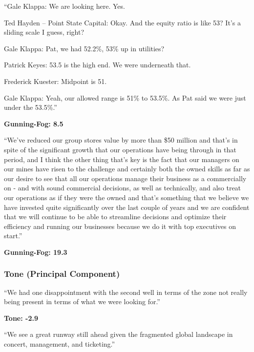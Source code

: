 \documentclass{article}[11pt]
\begin{document}
    \begin{em}
        ``Gale Klappa: We are looking here. Yes.

        Ted Hayden – Point State Capital: Okay. And the equity ratio is like 53? It’s a sliding scale I guess, right?

        Gale Klappa: Pat, we had 52.2\%, 53\% up in utilities?
        
        Patrick Keyes: 53.5 is the high end. We were underneath that.
        
        Frederick Kuester: Midpoint is 51.
        
        Gale Klappa: Yeah, our allowed range is 51\% to 53.5\%. As Pat said we were just under the 53.5\%.''
    \end{em}

    \textbf{Gunning-Fog: 8.5}

    \begin{em}
        ``We've reduced our group stores value by more than \$50 million and that’s in spite of the significant growth that our operations have being through in that period, and I think the other thing that’s key is the fact that our managers on our mines have risen to the challenge and certainly both the owned skills as far as our desire to see that all our operations manage their business as a commercially on - and with sound commercial decisions, as well as technically, and also treat our operations as if they were the owned and that’s something that we believe we have invested quite significantly over the last couple of years and we are confident that we will continue to be able to streamline decisions and optimize their efficiency and running our businesses because we do it with top executives on start.''
    \end{em}

    \textbf{Gunning-Fog: 19.3}

    \subsubsection{Tone (Principal Component)}

    \begin{em}
        ``We had one disappointment with the second well in terms of the zone not really being present in terms of what we were looking for.''
    \end{em}

    \textbf{Tone: -2.9}

    \begin{em}
        ``We see a great runway still ahead given the fragmented global landscape in concert, management, and ticketing.''
    \end{em}
\end{document}
